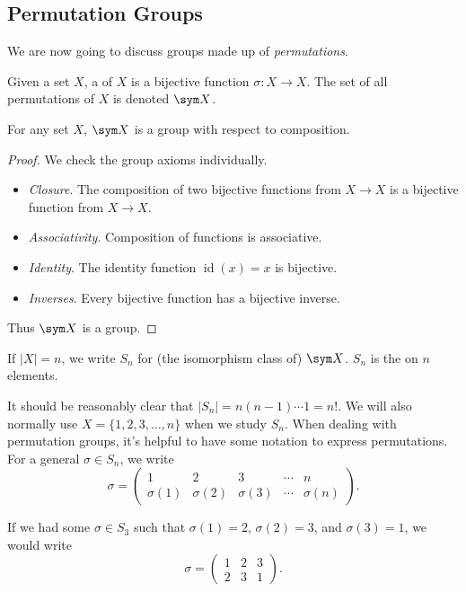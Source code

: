 \documentclass[a4paper]{scrartcl}
\begin{document}
\subsection{Permutation Groups}

We are now going to discuss groups made up of \emph{permutations}.

\begin{definition}[Permutations]
	Given a set $X$, a  of $X$ is a bijective function $\sigma: X \rightarrow X$. The set of all permutations of $X$ is denoted $\sym X$.
\end{definition}

\begin{theorem}
	For any set $X$, $\sym X$ is a group with respect to composition. 
\end{theorem}
\begin{proof}
	We check the group axioms individually.
	\begin{itemize}
		\item \emph{Closure}. The composition of two bijective functions from $X \rightarrow X$ is a bijective function from $X \rightarrow X$.
		\item \emph{Associativity}. Composition of functions is associative.
		\item \emph{Identity}. The identity function $\operatorname{id}(x) = x$ is bijective.
		\item \emph{Inverses}. Every bijective function has a bijective inverse.
	\end{itemize}
	Thus $\sym X$ is a group.
\end{proof}

\begin{definition}
	If $|X| = n$, we write $S_n$ for (the isomorphism class of) $\sym X$. $S_n$ is the  on $n$ elements.
\end{definition}

It should be reasonably clear that $|S_n| = n(n - 1) \cdots 1 = n!$. We will also normally use $X = \{1, 2, 3, \dots, n \}$ when we study $S_n$. When dealing with permutation groups, it's helpful to have some notation to express permutations. For a general $\sigma \in S_n$, we write
$$
\sigma = \begin{pmatrix}
	1 & 2 & 3 & \cdots & n \\
	\sigma(1) & \sigma(2) & \sigma(3) & \cdots & \sigma(n)
\end{pmatrix}.
$$

\begin{example}
	If we had some $\sigma \in S_3$ such that $\sigma(1) = 2$, $\sigma(2) = 3$, and $\sigma(3) = 1$, we would write
	$$
\sigma = \begin{pmatrix}
	1 & 2 & 3 \\
	2 & 3 & 1
\end{pmatrix}.
$$
\end{example}
\end{document}
